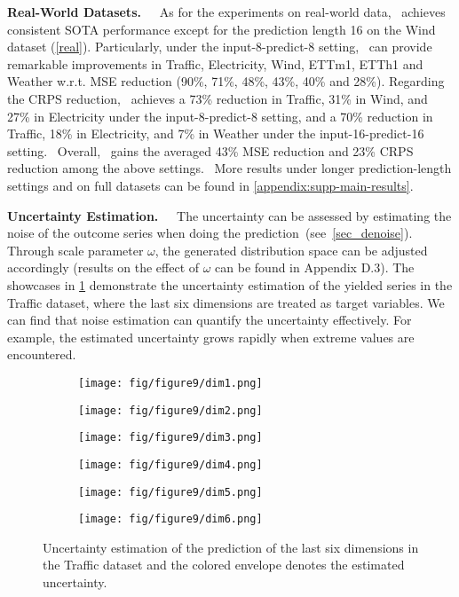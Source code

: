 \textbf{Real-World Datasets.~~} 
As for the experiments on real-world data, \ourmodel ~achieves consistent  SOTA performance except for the prediction length 16 on the Wind dataset (\cref{real}). 
Particularly, under the input-8-predict-8 setting, \ourmodel~can provide remarkable improvements in Traffic, Electricity, Wind, ETTm1, ETTh1 and Weather w.r.t. MSE reduction (90\%, 71\%, 48\%, 43\%, 40\% and 28\%). 
Regarding the CRPS reduction, \ourmodel~achieves a 73\% reduction in Traffic, 31\% in Wind, and 27\% in Electricity under the input-8-predict-8 setting, 
and a 70\% reduction in Traffic, 18\% in Electricity, and 7\% in Weather under the input-16-predict-16 setting.~%
Overall, \ourmodel~gains the averaged 43\% MSE reduction and 23\% CRPS reduction among the above settings.~%
More results under longer prediction-length settings and on full datasets can be found in  \cref{appendix:supp-main-results}. 

\textbf{Uncertainty Estimation.~~} 
The  uncertainty can be assessed by estimating the noise of the outcome series when doing the prediction~(see~\cref{sec_denoise}).  
Through scale parameter $\omega$, the generated distribution space can be adjusted accordingly (results on the effect of $\omega$ can be found  in Appendix D.3). %
The showcases in \cref{noise} demonstrate the uncertainty estimation of the yielded series in the Traffic dataset, where the last six dimensions are treated as target variables. 
We can find that noise estimation can quantify the uncertainty effectively. 
For example, the estimated uncertainty grows rapidly when extreme values are encountered. 

\begin{figure}[htbp]
    \centering
    \begin{subfigure}[t]{0.31\textwidth}
      \texttt{[image: fig/figure9/dim1.png]}
    \end{subfigure}
    \begin{subfigure}[t]{0.31\textwidth}
      \texttt{[image: fig/figure9/dim2.png]}
    \end{subfigure}
    \begin{subfigure}[t]{0.31\textwidth}
      \texttt{[image: fig/figure9/dim3.png]}
    \end{subfigure}
    
    \begin{subfigure}[t]{0.31\textwidth}
      \texttt{[image: fig/figure9/dim4.png]}
    \end{subfigure}
    \begin{subfigure}[t]{0.31\textwidth}
      \texttt{[image: fig/figure9/dim5.png]}
    \end{subfigure}
    \begin{subfigure}[t]{0.31\textwidth}
      \texttt{[image: fig/figure9/dim6.png]}
    \end{subfigure}
    \caption{
    Uncertainty estimation of the prediction of the last six dimensions in the Traffic dataset and the colored envelope denotes the estimated uncertainty.
    }
    \label{noise}
\end{figure}

